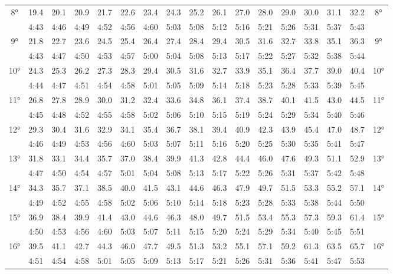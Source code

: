 \begin{footnotesize}
\begin{tabular}{c || c | c | c | c | c | c | c | c | c | c | c | c | c | c | c || c}
		\multirow{2}{*}{8°}&19.4&20.1&20.9&21.7&22.6&23.4&24.3&25.2&26.1&27.0&28.0&29.0&30.0&31.1&32.2&\multirow{2}{*}{8°}\\ \space&4:43&4:46&4:49&4:52&4:56&4:60&5:03&5:08&5:12&5:16&5:21&5:26&5:31&5:37&5:43&\space\\\hline
		\multirow{2}{*}{9°}&21.8&22.7&23.6&24.5&25.4&26.4&27.4&28.4&29.4&30.5&31.6&32.7&33.8&35.1&36.3&\multirow{2}{*}{9°}\\ \space&4:43&4:47&4:50&4:53&4:57&5:00&5:04&5:08&5:13&5:17&5:22&5:27&5:32&5:38&5:44&\space\\\hline
		\multirow{2}{*}{10°}&24.3&25.3&26.2&27.3&28.3&29.4&30.5&31.6&32.7&33.9&35.1&36.4&37.7&39.0&40.4&\multirow{2}{*}{10°}\\ \space&4:44&4:47&4:51&4:54&4:58&5:01&5:05&5:09&5:14&5:18&5:23&5:28&5:33&5:39&5:45&\space\\\hline
		\multirow{2}{*}{11°}&26.8&27.8&28.9&30.0&31.2&32.4&33.6&34.8&36.1&37.4&38.7&40.1&41.5&43.0&44.5&\multirow{2}{*}{11°}\\ \space&4:45&4:48&4:52&4:55&4:58&5:02&5:06&5:10&5:15&5:19&5:24&5:29&5:34&5:40&5:46&\space\\\hline
		\multirow{2}{*}{12°}&29.3&30.4&31.6&32.9&34.1&35.4&36.7&38.1&39.4&40.9&42.3&43.9&45.4&47.0&48.7&\multirow{2}{*}{12°}\\ \space&4:46&4:49&4:53&4:56&4:60&5:03&5:07&5:11&5:16&5:20&5:25&5:30&5:35&5:41&5:47&\space\\\hline
		\multirow{2}{*}{13°}&31.8&33.1&34.4&35.7&37.0&38.4&39.9&41.3&42.8&44.4&46.0&47.6&49.3&51.1&52.9&\multirow{2}{*}{13°}\\ \space&4:47&4:50&4:54&4:57&5:01&5:04&5:08&5:13&5:17&5:22&5:26&5:31&5:37&5:42&5:48&\space\\\hline
		\multirow{2}{*}{14°}&34.3&35.7&37.1&38.5&40.0&41.5&43.1&44.6&46.3&47.9&49.7&51.5&53.3&55.2&57.1&\multirow{2}{*}{14°}\\ \space&4:49&4:52&4:55&4:58&5:02&5:06&5:10&5:14&5:18&5:23&5:28&5:33&5:38&5:44&5:50&\space\\\hline
		\multirow{2}{*}{15°}&36.9&38.4&39.9&41.4&43.0&44.6&46.3&48.0&49.7&51.5&53.4&55.3&57.3&59.3&61.4&\multirow{2}{*}{15°}\\ \space&4:50&4:53&4:56&4:60&5:03&5:07&5:11&5:15&5:20&5:24&5:29&5:34&5:40&5:45&5:51&\space\\\hline
		\multirow{2}{*}{16°}&39.5&41.1&42.7&44.3&46.0&47.7&49.5&51.3&53.2&55.1&57.1&59.2&61.3&63.5&65.7&\multirow{2}{*}{16°}\\ \space&4:51&4:54&4:58&5:01&5:05&5:09&5:13&5:17&5:21&5:26&5:31&5:36&5:41&5:47&5:53&\space\\\hline

\end{tabular}
\end{footnotesize}
